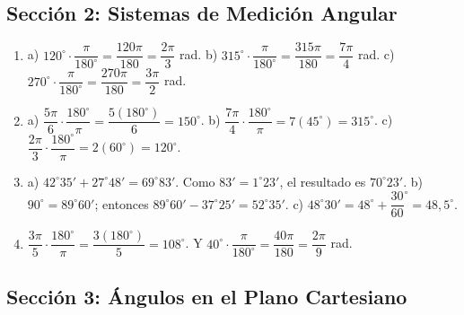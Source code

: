 \documentclass[12pt, letterpaper]{article}
\begin{document}
  \newpage

  \subsection*{Sección 2: Sistemas de Medición Angular}

  \begin{enumerate}[leftmargin=*, label=\textbf{\arabic*.}]
    \item a) $120^{\circ} \cdot \dfrac{\pi}{180^{\circ}} = \dfrac{120\pi}{180} = \dfrac{2\pi}{3}$ rad.
          \quad b) $315^{\circ} \cdot \dfrac{\pi}{180^{\circ}} = \dfrac{315\pi}{180} = \dfrac{7\pi}{4}$ rad.
          \quad c) $270^{\circ} \cdot \dfrac{\pi}{180^{\circ}} = \dfrac{270\pi}{180} = \dfrac{3\pi}{2}$ rad.

    \item a) $\dfrac{5\pi}{6} \cdot \dfrac{180^{\circ}}{\pi} = \dfrac{5(180^{\circ})}{6} = 150^{\circ}$.
          \quad b) $\dfrac{7\pi}{4} \cdot \dfrac{180^{\circ}}{\pi} = 7(45^{\circ}) = 315^{\circ}$.
          \quad c) $\dfrac{2\pi}{3} \cdot \dfrac{180^{\circ}}{\pi} = 2(60^{\circ}) = 120^{\circ}$.

    \item a) $42^{\circ} 35' + 27^{\circ} 48' = 69^{\circ} 83'$. Como $83' = 1^{\circ} 23'$, el resultado es $70^{\circ} 23'$.
          \quad b) $90^{\circ} = 89^{\circ} 60'$; entonces $89^{\circ} 60' - 37^{\circ} 25' = 52^{\circ} 35'$.
          \quad c) $48^{\circ} 30' = 48^{\circ} + \dfrac{30}{60}^{\circ} = 48{,}5^{\circ}$.

    \item $\dfrac{3\pi}{5} \cdot \dfrac{180^{\circ}}{\pi} = \dfrac{3(180^{\circ})}{5} = 108^{\circ}$. \quad
          Y $40^{\circ} \cdot \dfrac{\pi}{180^{\circ}} = \dfrac{40\pi}{180} = \dfrac{2\pi}{9}$ rad.
  \end{enumerate}

  \newpage

  \subsection*{Sección 3: Ángulos en el Plano Cartesiano}
\end{document}
